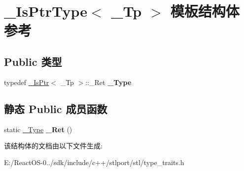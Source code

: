 \hypertarget{struct___is_ptr_type}{}\section{\+\_\+\+Is\+Ptr\+Type$<$ \+\_\+\+Tp $>$ 模板结构体 参考}
\label{struct___is_ptr_type}
\subsection*{Public 类型}
\begin{DoxyCompactItemize}
\item 
\mbox{\label{struct___is_ptr_type_aa7f33f1520395eb9fe2dce7c992691be}} 
typedef \hyperlink{struct___is_ptr}{\+\_\+\+Is\+Ptr}$<$ \+\_\+\+Tp $>$\+::\+\_\+\+Ret {\bfseries \+\_\+\+Type}
\end{DoxyCompactItemize}
\subsection*{静态 Public 成员函数}
\begin{DoxyCompactItemize}
\item 
\mbox{\label{struct___is_ptr_type_a4e7f91fc06d4ae39cc150b61c4a07765}} 
static \hyperlink{struct____true__type}{\+\_\+\+Type} {\bfseries \+\_\+\+Ret} ()
\end{DoxyCompactItemize}


该结构体的文档由以下文件生成\+:\begin{DoxyCompactItemize}
\item 
E\+:/\+React\+O\+S-\/0../sdk/include/c++/stlport/stl/type\+\_\+traits.\+h\end{DoxyCompactItemize}
